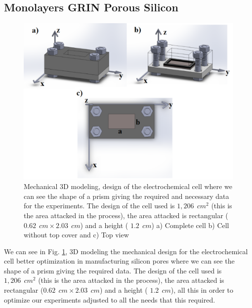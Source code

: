 \documentclass{article}
\begin{document}
\subsection{Monolayers GRIN Porous Silicon }
\begin{figure}
	\centering
	\includegraphics[width=\textwidth]{Images/celdan2}
	\caption{Mechanical 3D modeling, design of the
            electrochemical cell where we can see the shape of a prism
            giving the required and necessary data for the
            experiments. The design of the cell used is $ 1,206 \ \ cm
            ^ 2 $ (this is the area attacked in the process), the area
            attacked is rectangular ($ 0.62 \ \ cm \times 2.03 \ \ cm
            $) and a height ( $ 1.2 \ \ cm $) a) Complete cell b) Cell
            without top cover and c) Top view}
	\label{fig:por1}
\end{figure}
We can see in Fig. \ref{fig:por1}, 3D modeling the mechanical design
for the electrochemical cell  better optimization in manufacturing
silicon pores where we can see the shape of a prism giving the
required data. The design of the cell used is $ 1,206 \ \ cm ^ 2 $
(this is the area attacked in the process), the area attacked is
rectangular ($ 0.62 \ \ cm \times 2.03 \ \ cm $) and a height ( $ 1.2
\ \ cm $), all this in order to optimize our experiments adjusted to
all the needs that this required.
\end{document}

